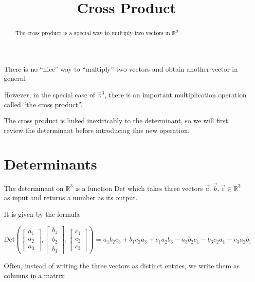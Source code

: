 \documentclass{ximera}
\title[Dig-In:]{Cross Product}
\begin{document}
\begin{abstract}
  The cross product is a special way to multiply two vectors in $\mathbb{R}^3$
\end{abstract}
\maketitle

There is no ``nice'' way to ``multiply'' two vectors and obtain another vector in general.

However, in the special case of $\mathbb{R}^3$, there is an important multiplication operation called ``the cross product''.  

The cross product is linked inextricably to the determinant, so we will first review the determinant before introducing this new operation.

\section{Determinants}

\begin{definition}
	The determinant on $\mathbb{R}^3$ is a function $\textrm{Det}$ which takes three vectors $\vec{a},\vec{b},\vec{c} \in \mathbb{R}^3$ as input and returns a number as its output.
	
	It is given by the formula
	
	\[
	\textrm{Det}\left(\begin{bmatrix} a_1 \\ a_2 \\a_3 \end{bmatrix}, \begin{bmatrix} b_1 \\ b_2 \\b_3 \end{bmatrix}, \begin{bmatrix} c_1 \\ c_2 \\c_3 \end{bmatrix} \right)  = a_1b_2c_3+b_1c_2a_3+c_1a_2b_3-a_3b_2c_1-b_3c_2a_1-c_3a_2b_1
	\]
	
	\end{definition}
	
	Often, instead of writing the three vectors as distinct entries, we write them as columns in a matrix:
	
\end{document}
